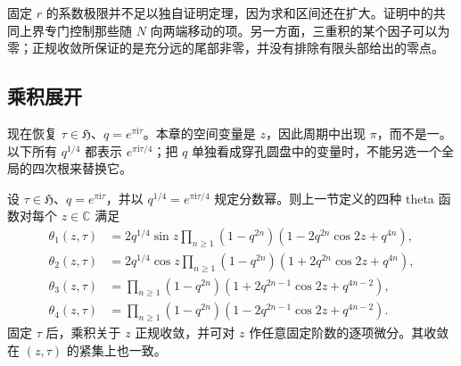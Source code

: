 固定 \(r\) 的系数极限并不足以独自证明定理，因为求和区间还在扩大。证明中的共同上界专门控制那些随 \(N\) 向两端移动的项。另一方面，三重积的某个因子可以为零；正规收敛所保证的是充分远的尾部非零，并没有排除有限头部给出的零点。

\subsection{乘积展开}
\label{b3:subsec:240202}

现在恢复 \(\tau\in\mathfrak H\)、\(q=e^{\pi\mathrm i\tau}\)。本章的空间变量是 \(z\)，因此周期中出现 \(\pi\)，而不是一。以下所有
\(q^{1/4}\) 都表示 \(e^{\pi\mathrm i\tau/4}\)；把 \(q\) 单独看成穿孔圆盘中的变量时，不能另选一个全局的四次根来替换它。

\begin{proposition}\label{b3:prop:24-theta-products}
设 \(\tau\in\mathfrak H\)、\(q=e^{\pi\mathrm i\tau}\)，并以
\(q^{1/4}=e^{\pi\mathrm i\tau/4}\) 规定分数幂。则上一节定义的四种 theta 函数对每个 \(z\in\mathbb C\) 满足
\begin{align}
 \theta_1(z,\tau)
 &=2q^{1/4}\sin z
   \prod_{n\ge1}(1-q^{2n})
   (1-2q^{2n}\cos2z+q^{4n}),
   \label{b3:eq:24-theta1-product}\\
 \theta_2(z,\tau)
 &=2q^{1/4}\cos z
   \prod_{n\ge1}(1-q^{2n})
   (1+2q^{2n}\cos2z+q^{4n}),
   \label{b3:eq:24-theta2-product}\\
 \theta_3(z,\tau)
 &=\prod_{n\ge1}(1-q^{2n})
   (1+2q^{2n-1}\cos2z+q^{4n-2}),
   \label{b3:eq:24-theta3-product}\\
 \theta_4(z,\tau)
 &=\prod_{n\ge1}(1-q^{2n})
   (1-2q^{2n-1}\cos2z+q^{4n-2}).
   \label{b3:eq:24-theta4-product}
\end{align}
固定 \(\tau\) 后，乘积关于 \(z\) 正规收敛，并可对 \(z\) 作任意固定阶数的逐项微分。其收敛在 \((z,\tau)\) 的紧集上也一致。
\end{proposition}
